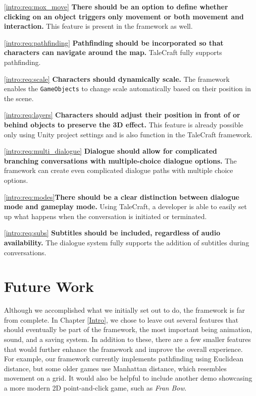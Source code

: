 \ref{intro:req:mox_move} \quad  \textbf{There should be an option to define whether clicking on an object triggers only movement or both movement and interaction.} This feature is present in the framework as well.

\ref{intro:req:pathfinding} \quad  \textbf{Pathfinding should be incorporated so that characters can navigate around the map.} TaleCraft fully supports pathfinding.

\ref{intro:req:scale} \quad  \textbf{Characters should dynamically scale.} The framework enables the \verb|GameObjects| to change scale automatically based on their position in the scene.
 
\ref{intro:req:layers} \quad  \textbf{Characters should adjust their position in front of or behind objects to preserve the 3D effect.} This feature is already possible only using Unity project settings and is also function in the TaleCraft framework.

\ref{intro:req:multi_dialogue} \quad  \textbf{Dialogue should allow for complicated branching conversations with multiple-choice dialogue options.} The framework can create even complicated dialogue paths with multiple choice options.

\ref{intro:req:modes}\quad  \textbf{There should be a clear distinction between dialogue mode and gameplay mode.} Using TaleCraft, a developer is able to easily set up what happens when the conversation is initiated or terminated.

\ref{intro:req:subs} \quad  \textbf{Subtitles should be included, regardless of audio availability.} The dialogue system fully supports the addition of subtitles during conversations.


\section{Future Work}
Although we accomplished what we initially set out to do, the framework is far from complete. In Chapter \ref{Intro}, we chose to leave out several features that should eventually be part of the framework, the most important being animation, sound, and a saving system. In addition to these, there are a few smaller features that would further enhance the framework and improve the overall experience. For example, our framework currently implements pathfinding using Euclidean distance, but some older games use Manhattan distance, which resembles movement on a grid. It would also be helpful to include another demo showcasing a more modern 2D point-and-click game, such as \textit{Fran Bow}. 
